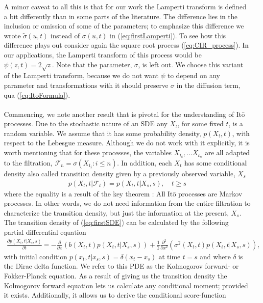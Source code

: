 A minor caveat to all this is that for our work the Lamperti transform is defined a bit differently than in some parts of the literature. The difference lies in the inclusion or omission of some of the parameters; to emphasize this difference we wrote $\tilde{\sigma}(u, t)$ instead of $\sigma(u, t)$ in (\ref{eq:firstLamperti}). To see how this difference plays out consider again the square root process (\ref{eq:CIR_process}). In our applications, the Lamperti transform of this process would be $\psi(z,t) = 2\sqrt{z}$. Note that the parameter, $\sigma$, is left out. We choose this variant of the Lamperti transform, because we do not want $\psi$ to depend on any parameter and transformations with it should preserve $\sigma$ in the diffusion term, qua (\ref{eq:ItoFormula}).\\\\
Commencing, we note another result that is pivotal for the understanding of Itō processes. Due to the stochastic nature of an SDE any $X_t$, for some fixed $t$, is a random variable. We assume that it has some probability density, $p(X_t, t)$, with respect to the Lebesgue measure. Although we do not work with it explicitly, it is worth mentioning that for these processes, the variables $X_{t_0}, \dots X_{t_n}$ are all adapted to the filtration, $\mathcal{F}_n = \sigma\left(X_{t_i}: i \leq n\right)$. In addition, each $X_t$ has some conditional density also called transition density given by a previously observed variable, $X_s$ 
\begin{align}
    p(X_t, t| \mathcal{F}_t) = p(X_t, t | X_s, s), \quad t\geq s
\end{align}
where the equality is a result of the key theorem \cite[theorem 7.1.2]{Oksendal2003_yu}: All Itō processes are Markov processes. In other words, we do not need information from the entire filtration to characterize the transition density, but just the information at the present, $X_s$. The transition density of (\ref{eq:firstSDE}) can be calculated by the following partial differential equation
\begin{align}
    \frac{\partial p(X_t, t | X_s, s)}{\partial t} = -\frac{\partial}{\partial x}\left(b(X_t, t)p(X_t, t | X_s, s)\right) + \frac{1}{2}\frac{\partial^2}{\partial x^2}\left(\sigma^2(X_t, t)p(X_t, t | X_s, s)\right),\label{eq:fokkerPlanck} 
\end{align}
with initial condition $p(x_t, t|x_s, s) = \delta(x_t - x_s)$ at time $t = s$ and where $\delta$ is the Dirac delta function. We refer to this PDE as the Kolmogorov forward- or Fokker-Planck equation. As a result of giving us the transition density the Kolmogorov forward equation lets us calculate any conditional moment; provided it exists. Additionally, it allows us to derive the conditional score-function
